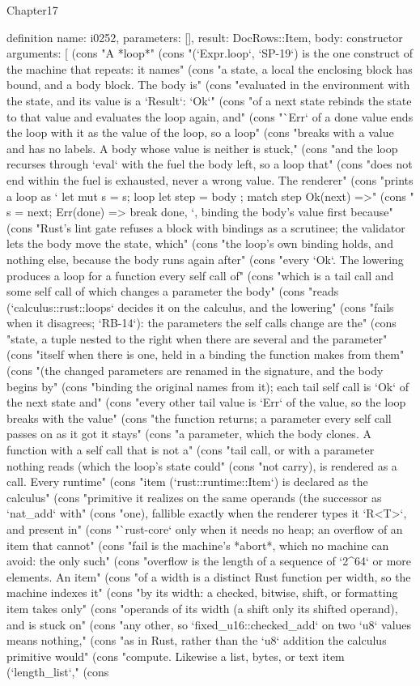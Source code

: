 \begin{lexlean}{Chapter17}
\begin{semanticmodule}
definition{
  name: i0252,
  parameters: [],
  result: DocRows::Item,
  body: constructor{
    arguments: [
      (cons "A *loop*" (cons "(`Expr.loop`, `SP-19`) is the one construct of the machine that repeats: it names" (cons "a state, a local the enclosing block has bound, and a body block. The body is" (cons "evaluated in the environment with the state, and its value is a `Result`: `Ok`" (cons "of a next state rebinds the state to that value and evaluates the loop again, and" (cons "`Err` of a done value ends the loop with it as the value of the loop, so a loop" (cons "breaks with a value and has no labels. A body whose value is neither is stuck," (cons "and the loop recurses through `eval` with the fuel the body left, so a loop that" (cons "does not end within the fuel is exhausted, never a wrong value. The renderer" (cons "prints a loop as `{ let mut s = s; loop { let step = { body }; match step { Ok(next) =>" (cons "{ s = next; } Err(done) => break done, } } }`, binding the body's value first because" (cons "Rust's lint gate refuses a block with bindings as a scrutinee; the validator lets the body move the state, which" (cons "the loop's own binding holds, and nothing else, because the body runs again after" (cons "every `Ok`. The lowering produces a loop for a function every self call of" (cons "which is a tail call and some self call of which changes a parameter the body" (cons "reads (`calculus::rust::loops` decides it on the calculus, and the lowering" (cons "fails when it disagrees; `RB-14`): the parameters the self calls change are the" (cons "state, a tuple nested to the right when there are several and the parameter" (cons "itself when there is one, held in a binding the function makes from them" (cons "(the changed parameters are renamed in the signature, and the body begins by" (cons "binding the original names from it); each tail self call is `Ok` of the next state and" (cons "every other tail value is `Err` of the value, so the loop breaks with the value" (cons "the function returns; a parameter every self call passes on as it got it stays" (cons "a parameter, which the body clones. A function with a self call that is not a" (cons "tail call, or with a parameter nothing reads (which the loop's state could" (cons "not carry), is rendered as a call. Every runtime" (cons "item (`rust::runtime::Item`) is declared as the calculus" (cons "primitive it realizes on the same operands (the successor as `nat_add` with" (cons "one), fallible exactly when the renderer types it `R<T>`, and present in" (cons "`rust-core` only when it needs no heap; an overflow of an item that cannot" (cons "fail is the machine's *abort*, which no machine can avoid: the only such" (cons "overflow is the length of a sequence of `2^64` or more elements. An item" (cons "of a width is a distinct Rust function per width, so the machine indexes it" (cons "by its width: a checked, bitwise, shift, or formatting item takes only" (cons "operands of its width (a shift only its shifted operand), and is stuck on" (cons "any other, so `fixed_u16::checked_add` on two `u8` values means nothing," (cons "as in Rust, rather than the `u8` addition the calculus primitive would" (cons "compute. Likewise a list, bytes, or text item (`length_list`," (cons }}
\end{semanticmodule}
\end{lexlean}
